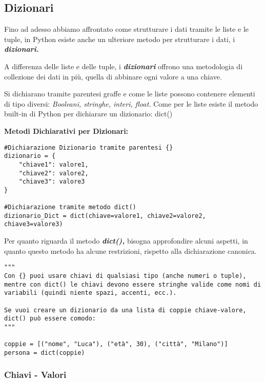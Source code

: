 \subsection{Dizionari}\label{IncipitDizionari}

Fino ad adesso abbiamo affrontato come strutturare i dati tramite le liste e le tuple, in Python esiste anche un ulteriore metodo per strutturare i dati, i \textit{\textbf{dizionari.}}

A differenza delle liste e delle tuple, i \textit{\textbf{dizionari}} offrono una metodologia di collezione dei dati in più, quella di abbinare ogni valore a una chiave.

Si dichiarano tramite parentesi graffe \textit{\textbf{{}}} e come le liste possono contenere elementi di tipo diversi: \textit{Booleani, stringhe, interi, float.} Come per le liste esiste il metodo built-in di Python per dichiarare un dizionario: dict()

\vspace{0.5cm}
\textbf{Metodi Dichiarativi per Dizionari:}
\begin{lstlisting}
#Dichiarazione Dizionario tramite parentesi {}
dizionario = {
    "chiave1": valore1,
    "chiave2": valore2,
    "chiave3": valore3
}

#Dichiarazione tramite metodo dict()
dizionario_Dict = dict(chiave=valore1, chiave2=valore2, chiave3=valore3)
\end{lstlisting}
\vspace{0.5cm}
Per quanto riguarda il metodo \textit{\textbf{dict(),}} bisogna approfondire alcuni aspetti, in quanto questo metodo ha alcune restrizioni, rispetto alla dichiarazione canonica.

\vspace{0.5cm}
\begin{lstlisting}
"""
Con {} puoi usare chiavi di qualsiasi tipo (anche numeri o tuple), mentre con dict() le chiavi devono essere stringhe valide come nomi di variabili (quindi niente spazi, accenti, ecc.).

Se vuoi creare un dizionario da una lista di coppie chiave-valore, dict() può essere comodo:
"""

coppie = [("nome", "Luca"), ("età", 30), ("città", "Milano")]
persona = dict(coppie)

\end{lstlisting}



\subsubsection{Chiavi - Valori}\label{ChiaveValoreDizionari}

